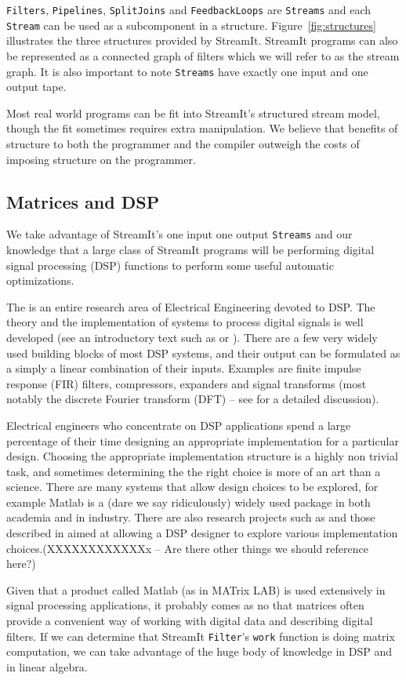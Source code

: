 {\tt Filters}, {\tt Pipelines}, {\tt SplitJoins} and {\tt FeedbackLoops} 
are {\tt Streams} and each {\tt Stream} can be used as a subcomponent in 
a structure. Figure~\ref{fig:structures} illustrates the three structures provided by StreamIt.
StreamIt programs can also be represented as a connected graph of filters 
which we will refer to as the stream graph. It is also important to note
{\tt Streams} have exactly one input and one output tape.

Most real world programs can be fit into StreamIt's structured stream model, 
though the fit sometimes requires extra manipulation. We believe
that benefits of structure to both the programmer and the compiler outweigh the
costs of imposing structure on the programmer.

\subsection{Matrices and DSP}
We take advantage of StreamIt's one input one output {\tt Streams} and 
our knowledge that a large class of StreamIt programs will be performing
digital signal processing (DSP) functions to perform some useful automatic 
optimizations.

The is an entire research area of Electrical Engineering devoted to DSP. The
theory and the implementation of systems to process digital signals is well developed (see
an introductory text such as\cite{oppenheim-discrete} or \cite{lyons-understanding}). 
There are a few very widely used building blocks of most DSP systems, and their output 
can be formulated as a simply a linear combination of their inputs. Examples are
finite impulse response (FIR) filters, compressors, expanders and signal transforms
(most notably the discrete Fourier transform (DFT) -- 
see \cite{oppenheim-discrete} for a detailed discussion).

Electrical engineers who concentrate on DSP applications spend a large percentage of their 
time designing an appropriate implementation for a particular design. Choosing
the appropriate implementation structure is a highly non trivial task, and sometimes determining the 
the right choice is more of an art than a science. There are many systems that allow design choices
to be explored, for example Matlab\cite{matlab} is a (dare we say ridiculously) widely used package 
in both academia and in industry. There are also research projects such as \cite{covell-ade} 
and those described in \cite{oppenheim-symbolic} aimed at allowing a DSP designer to explore
various implementation choices.(XXXXXXXXXXXXx -- Are there other things we should reference here?) 

Given that a product called Matlab (as in  MATrix LAB) is used extensively
in signal processing applications, it probably comes as no  that 
matrices often provide a convenient way of working with
digital data and describing digital filters. If we can determine that StreamIt {\tt Filter}'s
{\tt work} function is doing matrix computation, we can take advantage of the huge body
of knowledge in DSP and in linear algebra.
